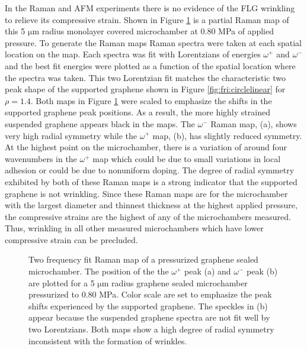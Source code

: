 In the Raman and AFM experiments there is no evidence of the FLG wrinkling to relieve its compressive strain.
Shown in Figure \ref{fig:fri:cylindrical} is a partial Raman map of this 5 $\mathrm{\mu}$m radius monolayer covered microchamber at 0.80 MPa of applied pressure.
To generate the Raman maps Raman spectra were taken at each spatial location on the map.
Each spectra was fit with Lorentzians of energies $\omega^+$ and $\omega^-$ and the best fit energies were plotted as a function of the spatial location where the spectra was taken.
This two Lorentzian fit matches the characteristic two peak shape of the supported graphene shown in Figure \ref{fig:fri:circlelinear} for $\rho=1.4$.
Both maps in Figure \ref{fig:fri:cylindrical} were scaled to emphasize the shifts in the supported graphene peak positions.
As a result, the more highly strained suspended graphene appears black in the maps.
The $\omega^-$ Raman map, (a), shows very high radial symmetry while the $\omega^+$ map, (b), has slightly reduced symmetry.
At the highest point on the microchamber, there is a variation of around four wavenumbers in the $\omega^+$ map which could be due to small variations in local adhesion or could be due to nonuniform doping.
The degree of radial symmetry exhibited by both of these Raman maps is a strong indicator that the supported graphene is not wrinkling.
Since these Raman maps are for the microchamber with the largest diameter and thinnest thickness at the highest applied pressure, the compressive strains are the highest of any of the microchambers measured.
Thus, wrinkling in all other measured microchambers which have lower compressive strain can be precluded.

\begin{figure}
	\begin{center}
	
	\end{center}
	\caption[Raman map of pressurized graphene sealed microchamber]{\label{fig:fri:cylindrical}
	Two frequency fit Raman map of a pressurized graphene sealed microchamber.
	The position of the the $\omega^+$ peak (a) and $\omega^-$ peak (b) are plotted for a 5 $\mathrm{\mu}$m radius graphene sealed microchamber pressurized to 0.80 MPa.
	Color scale are set to emphasize the peak shifts experienced by the supported graphene.
	The speckles in (b) appear because the suspended graphene spectra are not fit well by two Lorentzians.
	Both maps show a high degree of radial symmetry inconsistent with the formation of wrinkles.
	}
\end{figure}

